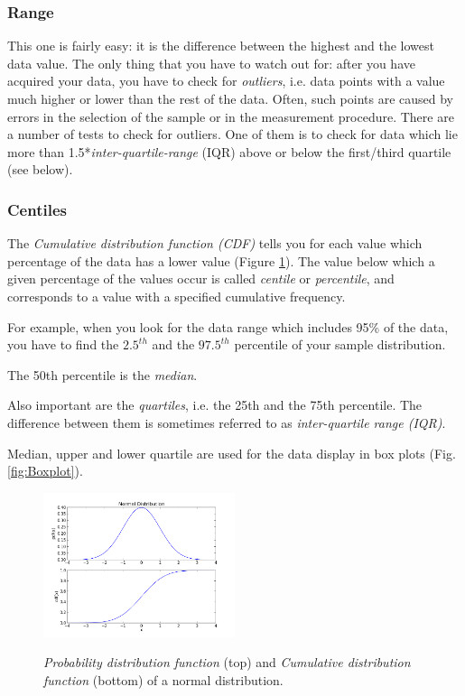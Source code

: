 \subsubsection{ Range }
This one is fairly easy: it is the difference between the highest and the lowest data value.
The only thing that you have to watch out for: after you have acquired your data, you have to check for \emph{outliers}, i.e. data points with a value much higher or lower than the rest of the data. Often, such points are caused by errors in the selection of the sample or in the measurement procedure. There are a number of tests to check for outliers. One of them is to check for data which lie more than 1.5*\emph{inter-quartile-range} (IQR) above or below the first/third quartile (see below).


\subsubsection{ Centiles }
The \emph{Cumulative distribution function (CDF) }  tells you for each value which percentage of the data has a lower value (Figure \ref{fig:CDF}). The value below which a given percentage of the values occur is called \emph{centile} or \emph{percentile}, and corresponds to a value with a specified cumulative frequency.

For example, when you look for the data range which includes 95\% of the data, you have to find the $2.5^{th}$ and the $97.5^{th}$ percentile of your sample distribution.

The 50th percentile is the \emph{median}.

Also important are the \emph{quartiles}, i.e. the 25th and the 75th percentile. The difference between them is sometimes referred to as \emph{inter-quartile range (IQR)}.

Median, upper and lower quartile are used for the data display in box plots (Fig.\ref{fig:Boxplot}).

\begin{figure}[ht]
  \centering
  \includegraphics[width=0.5\textwidth]{../Images/NormalDist_PDF_CDF.png}\\
  \caption{\emph{Probability distribution function} (top) and \emph{Cumulative distribution function} (bottom) of a normal distribution.}\label{fig:CDF}
\end{figure}


